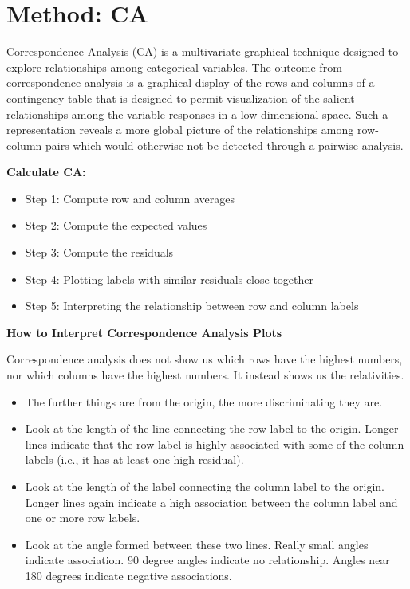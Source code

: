 \documentclass[]{book}
\providecommand{\tightlist}{%
  \setlength{\itemsep}{0pt}\setlength{\parskip}{0pt}}
\begin{document}
\hypertarget{method-ca}{%
\section{Method: CA}\label{method-ca}}

Correspondence Analysis (CA) is a multivariate graphical technique
designed to explore relationships among categorical variables. The
outcome from correspondence analysis is a graphical display of the rows
and columns of a contingency table that is designed to permit
visualization of the salient relationships among the variable responses
in a low-dimensional space. Such a representation reveals a more global
picture of the relationships among row-column pairs which would
otherwise not be detected through a pairwise analysis.

\textbf{Calculate CA:}

\begin{itemize}
\tightlist
\item
  Step 1: Compute row and column averages
\item
  Step 2: Compute the expected values
\item
  Step 3: Compute the residuals
\item
  Step 4: Plotting labels with similar residuals close together
\item
  Step 5: Interpreting the relationship between row and column labels
\end{itemize}

\textbf{How to Interpret Correspondence Analysis Plots}

Correspondence analysis does not show us which rows have the highest
numbers, nor which columns have the highest numbers. It instead shows us
the relativities.

\begin{itemize}
\tightlist
\item
  The further things are from the origin, the more discriminating they
  are.
\item
  Look at the length of the line connecting the row label to the origin.
  Longer lines indicate that the row label is highly associated with
  some of the column labels (i.e., it has at least one high residual).
\item
  Look at the length of the label connecting the column label to the
  origin. Longer lines again indicate a high association between the
  column label and one or more row labels.
\item
  Look at the angle formed between these two lines. Really small angles
  indicate association. 90 degree angles indicate no relationship.
  Angles near 180 degrees indicate negative associations.
\end{itemize}
\end{document}
